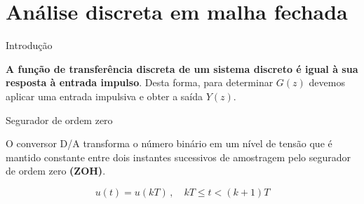 \section{Análise discreta em malha fechada}

\begin{frame}{Introdução}

\centering

\scalebox{0.5}{}

\hspace{0.5cm}

\begin{block}{}
\begin{minipage}{0.45\linewidth}
	\textbf{A função de transferência discreta de um sistema discreto é igual à sua resposta à entrada impulso}. Desta forma, para determinar $ G(z) $ devemos aplicar uma entrada impulsiva e obter a saída $ Y(z) $.
\end{minipage}
\hfill
\begin{minipage}{0.45\linewidth}
	\centering
\end{minipage}
\end{block}


\end{frame}


\begin{frame}{Segurador de ordem zero}
\begin{block}{}
O conversor D/A transforma o número binário em um nível de tensão que é mantido constante entre dois instantes sucessivos de amostragem pelo segurador de ordem zero \textbf{(ZOH)}.
\end{block}
\begin{minipage}{0.45\linewidth}
	\centering
	\scalebox{0.8}{
		}
\end{minipage}
\hfill
\begin{minipage}{0.45\linewidth}
	\centering
	\scalebox{0.8}{
		}
\end{minipage}


\[ u(t)=u(kT)\, ,\quad kT\leqslant t<(k+1)T \]
\end{frame}


